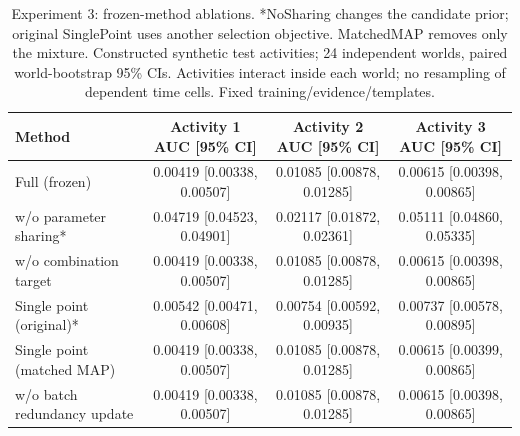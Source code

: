 \begin{table}[t]
\centering
\small
\caption{Experiment 3: frozen-method ablations. *NoSharing changes the candidate prior; original SinglePoint uses another selection objective. MatchedMAP removes only the mixture. Constructed synthetic test activities; 24 independent worlds, paired world-bootstrap 95\% CIs. Activities interact inside each world; no resampling of dependent time cells. Fixed training/evidence/templates.}
\begin{tabular}{lccc}
\toprule
Method & Activity 1 AUC [95\% CI] & Activity 2 AUC [95\% CI] & Activity 3 AUC [95\% CI] \\
\midrule
Full (frozen) & 0.00419 [0.00338, 0.00507] & 0.01085 [0.00878, 0.01285] & 0.00615 [0.00398, 0.00865] \\
w/o parameter sharing* & 0.04719 [0.04523, 0.04901] & 0.02117 [0.01872, 0.02361] & 0.05111 [0.04860, 0.05335] \\
w/o combination target & 0.00419 [0.00338, 0.00507] & 0.01085 [0.00878, 0.01285] & 0.00615 [0.00398, 0.00865] \\
Single point (original)* & 0.00542 [0.00471, 0.00608] & 0.00754 [0.00592, 0.00935] & 0.00737 [0.00578, 0.00895] \\
Single point (matched MAP) & 0.00419 [0.00338, 0.00507] & 0.01085 [0.00878, 0.01285] & 0.00615 [0.00399, 0.00865] \\
w/o batch redundancy update & 0.00419 [0.00338, 0.00507] & 0.01085 [0.00878, 0.01285] & 0.00615 [0.00398, 0.00865] \\
\bottomrule
\end{tabular}
\end{table}
